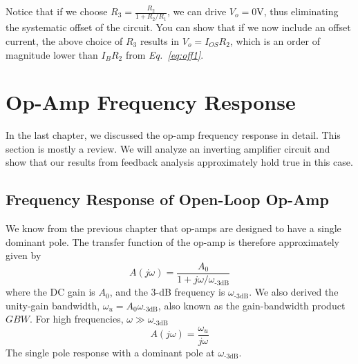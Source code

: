 Notice that if we choose $R_3 = \frac{R_2}{1 + R_2/R_1}$, we can drive $V_o = 0$V, thus eliminating the systematic offset of the circuit.  You can show that if we now include an offset current, the above choice of $R_3$ results in $V_o = I_{OS} R_2 $, which is an order of magnitude lower than $I_B R_2$ from \emph{Eq.~\ref{eq:off1}}.
\section{Op-Amp Frequency Response}
In the last chapter, we discussed the op-amp frequency response in detail. This section is mostly a review.  We will analyze an inverting amplifier circuit and show that our results from feedback analysis approximately hold true in this case.
\subsection{Frequency Response of Open-Loop Op-Amp}
We know from the previous chapter that op-amps are designed to have a single dominant pole.  The transfer function of the op-amp is therefore approximately given by
    \begin{equation} 
        A(j\omega) = \frac{A_0}{1 + j\omega/\omega_\text{-3dB}} 
    \end{equation}
where the DC gain is $A_0$, and the 3-dB frequency is $\omega_{\text{-3dB}}$.  We also derived the unity-gain bandwidth, $\omega_u = A_0 \omega_{\text{-3dB}}$, also known as the  gain-bandwidth product $GBW$.  For high frequencies, $\omega \gg \omega_{\text{-3dB}}$
    \begin{equation}
        A(j\omega) = \frac{\omega_u}{j\omega}
    \end{equation}
The single pole response with a dominant pole at $\omega_{\text{-3dB}}$.
